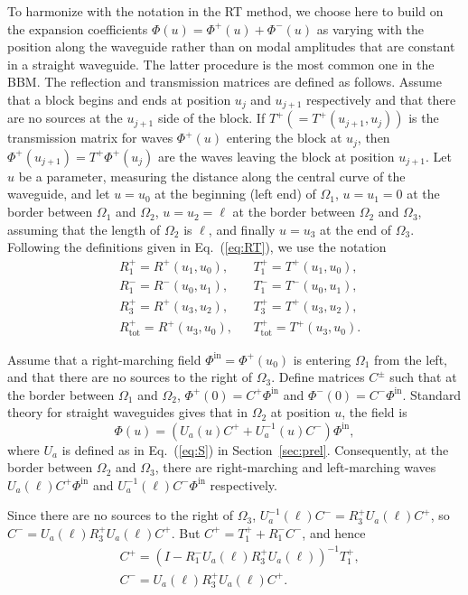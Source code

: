 \documentclass[numreferences]{kluwer}
\renewcommand{\Phi}{\varPhi}
\renewcommand{\vec}[1]{\bm{#1}}
\renewcommand{\Phi}{\varPhi}
\newcommand{\Phiin}{\vec\Phi^{\text{in}}}
\newcommand{\Ttot}{T^+_{\text{tot}}}
\newcommand{\Rtot}{R^+_{\text{tot}}}
\begin{document}
To harmonize with the notation in the RT method, we choose here to build on the expansion coefficients $\vec\Phi(u)=\vec\Phi^+(u)+\vec\Phi^-(u)$ as varying with the position along
the waveguide rather than on modal amplitudes that are constant in a straight waveguide. The latter procedure is the most common one in the BBM. The reflection and
transmission matrices are defined as follows. Assume that a block
begins and ends at position $u_j$ and $u_{j+1}$ respectively and that
there are no sources at the $u_{j+1}$ side of the block. If $T^+(=T^+(u_{j+1},u_j))$
is the transmission matrix for waves $\vec\Phi^+(u)$ entering the block
at $u_{j}$, then $\vec\Phi^+(u_{j+1})=T^+\vec\Phi^+(u_{j})$ are the waves leaving
the block at position $u_{j+1}$. Let $u$ be a parameter, measuring the
distance along the central curve of the waveguide, and let $u=u_0$ at
the beginning (left end) of $\Omega_1$, $u=u_1=0$ at the border between
$\Omega_1$ and $\Omega_2$, $u=u_2=\ell$ at the border between $\Omega_2$
and $\Omega_3$, assuming that the length of $\Omega_2$ is $\ell$,
 and finally $u=u_3$ at the end of
$\Omega_3$. Following the definitions given in Eq.~(\ref{eq:RT}), we
use the notation
\begin{align*}
  &R^+_1=R^+(u_1,u_0),&&T^+_1=T^+(u_1,u_0),\\
  &R^-_1=R^-(u_0,u_1),&&T^-_1=T^-(u_0,u_1),\\
  &R^+_3=R^+(u_3,u_2),&&T^+_3=T^+(u_3,u_2),\\
  &\Rtot=R^+(u_3,u_0),&&\Ttot=T^+(u_3,u_0).
\end{align*}

Assume that a right-marching field $\Phiin=\vec\Phi^+(u_0)$ is entering
$\Omega_1$ from the left, and that there are no sources to the right of
$\Omega_3$. Define matrices $C^\pm$ such that at the border between
$\Omega_1$ and $\Omega_2$, $\vec\Phi^+(0)=C^+\Phiin$ and
$\vec\Phi^-(0)=C^-\Phiin$. Standard theory for
straight waveguides gives that in $\Omega_2$ at position $u$, the
field is
\begin{equation}
  \label{eq:midfield}
  \vec\Phi(u)=(U_a(u)C^++U_a^{-1}(u)C^-)\Phiin,
\end{equation}
where $U_a$ is defined as in Eq.~(\ref{eq:S}) in
Section~\ref{sec:prel}.  Consequently, at the border between
$\Omega_2$ and $\Omega_3$, there are right-marching and left-marching
waves $U_a(\ell)C^+\Phiin$ and $U_a^{-1}(\ell)C^-\Phiin$ respectively.

Since there are no sources to the right of $\Omega_3$,
$U_a^{-1}(\ell)C^-=R_3^{+}U_a(\ell)C^+$, so
$C^-=U_a(\ell)R_3^{+}U_a(\ell)C^+$. But $C^+=T_1^{+}+R_1^{-}C^-$, and
hence
\begin{equation}
  \label{eq:ABRtotTtot}
  \begin{split}
    &C^+=\left(I-R_1^{-}U_a(\ell)R_3^{+}U_a(\ell)\right)^{-1}T_1^{+},\\
    &C^-=U_a(\ell)R_3^{+}U_a(\ell)C^+.
      \end{split}
\end{equation}
\end{document}
